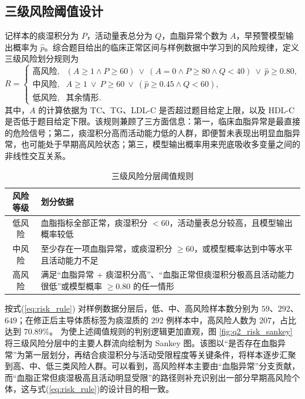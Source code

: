\documentclass{MathorCupmodeling}
\begin{document}
	\subsection{三级风险阈值设计}
	记样本的痰湿积分为 $P$，活动量表总分为 $Q$，血脂异常个数为 $A$，早预警模型输出概率为 $\hat{p}$。综合题目给出的临床正常区间与样例数据中学习到的风险规律，定义三级风险划分规则为
	\begin{equation}
		R=
		\begin{cases}
			\text{高风险}, & (A\ge 1 \land P\ge 60)\ \lor\ (A=0 \land P\ge 80 \land Q<40)\ \lor\ \hat{p}\ge 0.80,\\
			\text{中风险}, & A\ge 1\ \lor\ P\ge 60\ \lor\ (\hat{p}\ge 0.45 \land Q<60),\\
			\text{低风险}, & \text{其余情形}.
		\end{cases}
		\label{eq:risk_rule}
	\end{equation}
	其中，$A$ 的计算依据为 TC、TG、LDL-C 是否超过题目给定上限，以及 HDL-C 是否低于题目给定下限。该规则兼顾了三方面信息：第一，临床血脂异常是最直接的危险信号；第二，痰湿积分高而活动能力低的人群，即便暂未表现出明显血脂异常，也可能处于早期高风险状态；第三，模型输出概率用来兜底吸收多变量之间的非线性交互关系。

	\begin{table}[H]
		\centering
		\caption{三级风险分层阈值规则}\label{tab:q2_threshold}
		\begin{tabularx}{0.95\textwidth}{c X}
			\toprule
			风险等级 & 划分依据\\
			\midrule
			低风险 & 血脂指标全部正常，痰湿积分 $<60$，活动量表总分较高，且模型输出概率较低\\
			中风险 & 至少存在一项血脂异常，或痰湿积分 $\ge 60$，或模型概率达到中等水平且活动能力不足\\
			高风险 & 满足“血脂异常 + 痰湿积分高”、“血脂正常但痰湿积分极高且活动能力很低”或模型概率 $\ge 0.80$ 的任一情形\\
			\bottomrule
		\end{tabularx}
	\end{table}

		按式(\ref{eq:risk_rule}) 对样例数据分层后，低、中、高风险样本数分别为 $59$、$292$、$649$；在修正后主导体质标签为痰湿质的 $292$ 例样本中，高风险人数为 $207$，占比达到 $70.89\%$。
		为使上述阈值规则的判别逻辑更加直观，图 \ref{fig:q2_risk_sankey} 将三级风险分层中的主要人群流向绘制为 Sankey 图。该图以“是否存在血脂异常”为第一层划分，再结合痰湿积分与活动受限程度等关键条件，将样本逐步汇聚到高、中、低三类风险人群。可以看到，高风险样本主要由“血脂异常”分支贡献，而“血脂正常但痰湿极高且活动明显受限”的路径则补充识别出一部分早期高风险个体，这与式(\ref{eq:risk_rule})的设计目的相一致。
\end{document}
